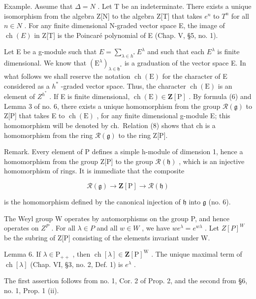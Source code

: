 Example. Assume that \(\Delta = N\) . Let T be an indeterminate. There exists a unique isomorphism from the algebra Z{[}N{]} to the algebra Z{[}T{]} that takes \(e^{n}\) to \(T^{n}\) for all \(n \in N\) . For any finite dimensional N-graded vector space E, the image of \(\operatorname{ch}(E)\) in Z{[}T{]} is the Poincaré polynomial of E (Chap. V, §5, no. 1).

Let E be a g-module such that \(E = \sum_{\lambda \in h^{*}} E^{\lambda}\) and such that each \(E^{\lambda}\) is finite dimensional. We know that \((\mathrm{E}^{\lambda})_{\lambda \in \mathfrak{h}^{*}}\) is a graduation of the vector space E. In what follows we shall reserve the notation \(\operatorname{ch}(\mathrm{E})\) for the character of E considered as a \(h^{*}\) -graded vector space. Thus, the character \(\operatorname{ch}(\mathrm{E})\) is an element of \(Z^{h^{*}}\) . If E is finite dimensional, \(\operatorname{ch}(\mathrm{E}) \in \mathbf{Z}[\mathrm{P}]\) . By formula (6) and Lemma 3 of no. 6, there exists a unique homomorphism from the group \(\mathcal{R}(\mathfrak{g})\) to Z{[}P{]} that takes E to \(\operatorname{ch}(\mathrm{E})\) , for any finite dimensional g-module E; this homomorphism will be denoted by ch.~Relation (8) shows that ch is a homomorphism from the ring \(\mathcal{R}(\mathfrak{g})\) to the ring Z{[}P{]}.

Remark. Every element of P defines a simple h-module of dimension 1, hence a homomorphism from the group Z{[}P{]} to the group \(\mathcal{R}(\mathfrak{h})\) , which is an injective homomorphism of rings. It is immediate that the composite

\[
\mathcal {R} (\mathfrak {g}) \longrightarrow \mathbf {Z} [ \mathrm{P} ] \longrightarrow \mathcal {R} (\mathfrak {h})
\]

is the homomorphism defined by the canonical injection of \(\mathfrak{h}\) into \(\mathfrak{g}\) (no. 6).

The Weyl group W operates by automorphisms on the group P, and hence operates on \(Z^{P}\) . For all \(\lambda \in P\) and all \(w \in W\) , we have \(we^{\lambda} = e^{w\lambda}\) . Let \(Z[P]^{W}\) be the subring of Z{[}P{]} consisting of the elements invariant under W.

Lemma 6. If \(\lambda \in \mathrm{P}_{++}\) , then \(\operatorname{ch}[\lambda] \in \mathbf{Z}[\mathrm{P}]^{\mathrm{W}}\) . The unique maximal term of \(\operatorname{ch}[\lambda]\) (Chap. VI, §3, no. 2, Def. 1) is \(e^{\lambda}\) .

The first assertion follows from no. 1, Cor. 2 of Prop. 2, and the second from §6, no. 1, Prop. 1 (ii).

